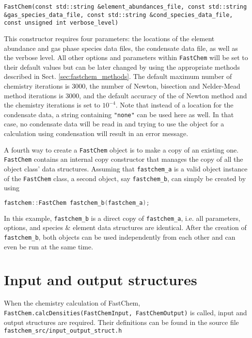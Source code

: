 \documentclass[numbers=noenddot]{aux/fcmanual}
\newcommand{\fc}{\texttt{FastChem}\xspace}
\begin{document}
\lstinline[breaklines=true]!FastChem(const std::string &element_abundances_file, const std::string &gas_species_data_file, const std::string &cond_species_data_file, const unsigned int verbose_level)!
\begin{addmargin}[25pt]{0pt}
	This constructor requires four parameters: the locations of the element abundance and gas phase species data files, the condensate data file, as well as the verbose level. All other options and parameters within \fc will be set to their default values but can be later changed by using the appropriate methods described in Sect. \ref{sec:fastchem_methods}. The default maximum number of chemistry iterations is 3000, the number of Newton, bisection and Nelder-Mead method iterations is 3000, and the default accuracy of the of Newton method and the chemistry iterations is set to $10^{-4}$. Note that instead of a location for the condensate data, a string containing \lstinline!"none"! can be used here as well. In that case, no condensate data will be read in and trying to use the object for a calculation using condensation will result in an error message.
\end{addmargin}

\bigbreak

A fourth way to create a \fc object is to make a copy of an existing one. \fc contains an internal copy constructor that manages the copy of all the object class' data structures. Assuming that \lstinline!fastchem_a! is a valid object instance of the \fc class, a second object, say \lstinline!fastchem_b!, can simply be created by using 
\begin{lstlisting}[language=C++]
  fastchem::FastChem fastchem_b(fastchem_a);
\end{lstlisting}

In this example, \lstinline!fastchem_b! is a direct copy of \lstinline!fastchem_a!, i.e. all parameters, options, and species \& element data structures are identical. After the creation of \lstinline!fastchem_b!, both objects can be used independently from each other and can even be run at the same time. 



\section{Input and output structures}

When the chemistry calculation of FastChem, \lstinline!FastChem.calcDensities(FastChemInput, FastChemOutput)! is called, input and output structures are required. Their definitions can be found in the source file \verb|fastchem_src/input_output_struct.h|
\end{document}
